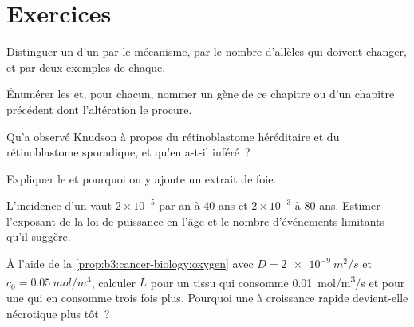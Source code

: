 \section{Exercices}

\begin{exercise}[$\star$]\label{exo:b3:cancer-biology:1}
Distinguer un  d'un  par le
mécanisme, par le nombre d'allèles qui doivent changer, et par deux
exemples de chaque.
\end{exercise}

\begin{exercise}[$\star$]\label{exo:b3:cancer-biology:2}
Énumérer les  et, pour chacun, nommer
un gène de ce chapitre ou d'un chapitre précédent dont l'altération le
procure.
\end{exercise}

\begin{exercise}[$\star$]\label{exo:b3:cancer-biology:3}
Qu'a observé Knudson à propos du rétinoblastome héréditaire et du
rétinoblastome sporadique, et qu'en a-t-il inféré~?
\end{exercise}

\begin{exercise}[$\star$]\label{exo:b3:cancer-biology:4}
Expliquer le  et pourquoi on y ajoute un extrait de foie.
\end{exercise}

\begin{exercise}[$\star\star$]\label{exo:b3:cancer-biology:5}
L'incidence d'un  vaut $2\times 10^{-5}$ par an à $40$ ans et
$2\times 10^{-3}$ à $80$ ans. Estimer l'exposant de la loi de puissance
en l'âge et le nombre d'événements limitants qu'il suggère.
\end{exercise}

\begin{exercise}[$\star\star$]\label{exo:b3:cancer-biology:6}
À l'aide de la \cref{prop:b3:cancer-biology:oxygen} avec $D =
\qty{2e-9}{m^2/s}$ et $c_{0} = \qty{0.05}{mol/m^3}$, calculer $L$ pour
un tissu qui consomme \qty{0.01}{mol/m^3/s} et pour une  qui en
consomme trois fois plus. Pourquoi une  à croissance rapide
devient-elle nécrotique plus tôt~?
\end{exercise}

